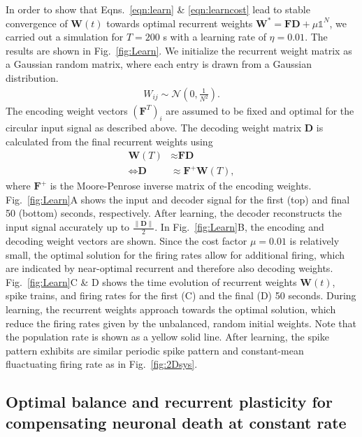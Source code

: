\documentclass[twoside,twocolumn]{article}
\renewcommand{\b}[1]{\textbf{#1}}
\begin{document}
In order to show that Eqns.~\ref{eqn:learn} \& \ref{eqn:learncost} lead to stable convergence of $\b{W}(t)$ towards optimal recurrent weights $\b{W}^*=\b{F}\b{D} + \mu \mathbb{1}^N$, we carried out a simulation for $T=200$ s with a learning rate of $\eta=0.01$. The results are shown in Fig.~\ref{fig:Learn}. We initialize the recurrent weight matrix as a Gaussian random matrix, where each entry is drawn from a Gaussian distribution.  
\begin{align}
W_{ij} \sim \mathcal{N}\left(0,\frac{1}{N^2}\right).
\end{align}
The encoding weight vectors $(\b{F}^T)_i$ are assumed to be fixed and optimal for the circular input signal as described above. The decoding weight matrix $\b{D}$ is calculated from the final recurrent weights using
\begin{align*}
\b{W}(T) &\approx \b{F}\b{D} \\
\Leftrightarrow \b{D} &\approx \b{F}^+\b{W}(T),
\label{eqn:pseudo}
\end{align*}
where $\b{F}^+$ is the Moore-Penrose inverse matrix of the encoding weights. Fig.~\ref{fig:Learn}A shows the input and decoder signal for the first (top) and final 50 (bottom) seconds, respectively. After learning, the decoder reconstructs the input signal accurately up to $\frac{\|\b{D}\|}{2}$. In Fig.~\ref{fig:Learn}B, the encoding and decoding weight vectors are shown. Since the cost factor $\mu=0.01$ is relatively small, the optimal solution for the firing rates allow for additional firing, which are indicated by near-optimal recurrent and therefore also decoding weights. Fig.~\ref{fig:Learn}C \& D shows the time evolution of recurrent weights $\b{W}(t)$, spike trains, and firing rates for the first (C) and the final (D) 50 seconds. During learning, the recurrent weights approach towards the optimal solution, which reduce the firing rates given by the unbalanced, random initial weights. Note that the population rate is shown as a yellow solid line. After learning, the spike pattern exhibits are similar periodic spike pattern and constant-mean fluactuating firing rate as in Fig.~\ref{fig:2Dsys}.

\subsection{Optimal balance and recurrent plasticity for compensating neuronal death at constant rate}
\end{document}
